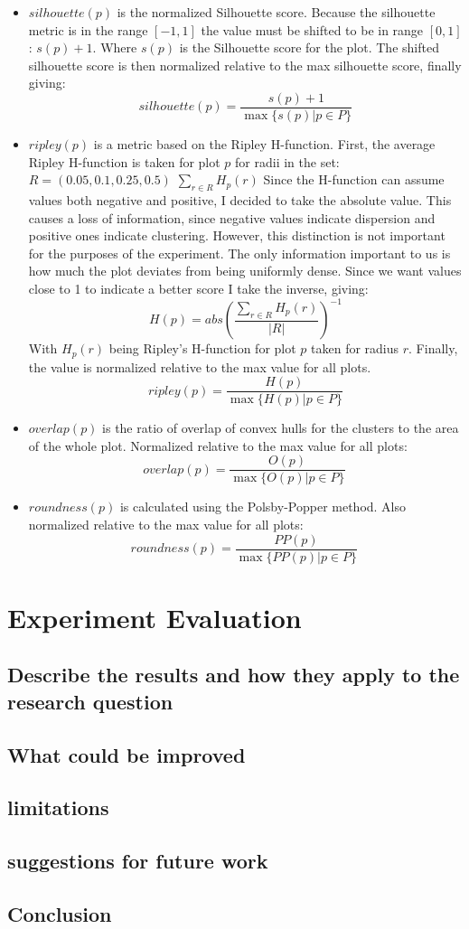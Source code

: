 \documentclass[11pt]{article}
\begin{document}
\begin{itemize}
\item \(silhouette(p)\) is the normalized Silhouette score. Because the silhouette metric is in the range \([-1, 1]\) the value must be shifted to be in range \([0, 1]\): \(s(p) + 1\). Where \(s(p)\) is the Silhouette score for the plot. The shifted silhouette score is then normalized relative to the max silhouette score, finally giving:
\[silhouette(p) = \frac{s(p) + 1}{\max\{s(p) | p \in P\}}\]
\item \(ripley(p)\) is a metric based on the Ripley H-function. First, the average Ripley H-function is taken for plot \(p\) for radii in the set: \(R = (0.05, 0.1, 0.25, 0.5)\) \(\sum_{r \in R} H_{p}(r)\) Since the H-function can assume values both negative and positive, I decided to take the absolute value. This causes a loss of information, since negative values indicate dispersion and positive ones indicate clustering. However, this distinction is not important for the purposes of the experiment. The only information important to us is how much the plot deviates from being uniformly dense. Since we want values close to 1 to indicate a better score I take the inverse, giving:
\[H(p) = abs(\frac{\sum_{r \in R} H_{p}(r)}{|R|})^{-1}\]
With \(H_{p}(r)\) being Ripley's H-function for plot \(p\) taken for radius \(r\). Finally, the value is normalized relative to the max value for all plots.
\[ ripley(p) = \frac{H(p)}{ \max \{ H(p)| p \in P \}} \]
\item \(overlap(p)\) is the ratio of overlap of convex hulls for the clusters to the area of the whole plot. Normalized relative to the max value for all plots:
\[ overlap(p) = \frac{O(p)}{ \max \{ O(p)| p \in P \}} \  \]
\item \(roundness(p)\) is calculated using the Polsby-Popper method. Also normalized relative to the max value for all plots:
\[ roundness(p) = \frac{PP(p)}{ \max \{ PP(p)| p \in P \}} \  \]
\end{itemize}
\section{Experiment Evaluation}
\label{sec:org27ef056}
\subsection{Describe the results and how they apply to the research question}
\label{sec:org883b726}
\subsection{What could be improved}
\label{sec:org9d1573d}
\subsection{limitations}
\label{sec:org9a22d80}
\subsection{suggestions for future work}
\label{sec:orge6a4dd1}
\subsection{Conclusion}
\label{sec:org0b64a06}


\end{document}
